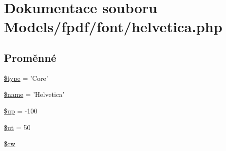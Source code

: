 \hypertarget{helvetica_8php}{\section{Dokumentace souboru Models/fpdf/font/helvetica.php}
\label{helvetica_8php}
}
\subsection*{Proměnné}
\begin{DoxyCompactItemize}
\item 
\hyperlink{helvetica_8php_a9a4a6fba2208984cabb3afacadf33919}{\$type} = 'Core'
\item 
\hyperlink{helvetica_8php_ab2fc40d43824ea3e1ce5d86dee0d763b}{\$name} = 'Helvetica'
\item 
\hyperlink{helvetica_8php_a6b5ad2ac55f9df46e8f34e78fbd6f176}{\$up} = -\/100
\item 
\hyperlink{helvetica_8php_aadd3f841051043ee58e587e840e8dd0b}{\$ut} = 50
\item 
\hyperlink{helvetica_8php_ac2951b03dbb0317e6c61ec920b7479dc}{\$cw}
\end{DoxyCompactItemize}


